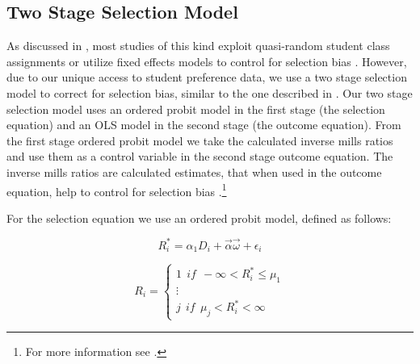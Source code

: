 \subsection{Two Stage Selection Model}\label{methods:tssmodel}

As discussed in , most studies of this kind exploit quasi-random student class assignments or utilize fixed effects models to control for selection bias \citep{kang2007classroom,carman2012classroom,schlosser2008inside,lavy2012good}. 
However, due to our unique access to student preference data, we use a two stage selection model to correct for selection bias, similar to the one described in \citet{heckman1979sample}. 
Our two stage selection model uses an ordered probit model in the first stage (the selection equation) and an OLS model in the second stage (the outcome equation). 
From the first stage ordered probit model we take the calculated inverse mills ratios and use them as a control variable in the second stage outcome equation. 
The inverse mills ratios are calculated estimates, that when used in the outcome equation, help to control for selection bias \citep{heckman1979sample}.\footnote{For more information see \citet{greene2002limdep}.}

For the selection equation we use an ordered probit model, defined as follows:

\setlength{\belowdisplayskip}{5pt} \setlength{\belowdisplayshortskip}{1pt}
\setlength{\abovedisplayskip}{-6pt} \setlength{\abovedisplayshortskip}{1pt}

\begin{equation}\label{eq:1}
R_{i}^{*} = \alpha_{1} D_{i} + \overrightarrow{\alpha} \overrightarrow{\omega} + \epsilon_{i}
\end{equation}

\setlength{\belowdisplayskip}{11pt} \setlength{\belowdisplayshortskip}{1pt}
\setlength{\abovedisplayskip}{-4pt} \setlength{\abovedisplayshortskip}{1pt}

\begin{equation}\label{eq:2}
R_{i} = 
\begin{cases}
  1 \ \ if \ \ - \infty < R_{i}^{*} \leq \mu_{1} \\
  \vdots \\
  j \ \ if \ \ \mu_{j} < R_{i}^{*} < \infty
\end{cases}
\end{equation}

